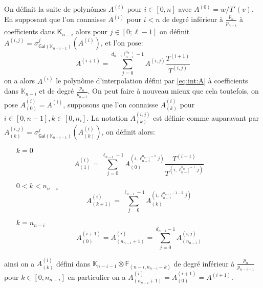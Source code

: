 \documentclass[10pt,a4paper]{book}
\theoremstyle{plain}
\theoremstyle{definition}
\theoremstyle{definition}
\theoremstyle{definition}
\theoremstyle{definition}
\theoremstyle{remark}
\theoremstyle{remark}
\theoremstyle{definition}
\begin{document}
On définit la suite de polynômes $A^{(i)}$ pour $i \in [0, n]$ avec
 $A^{(0)}=w/T'(v)$. En  supposant que l'on connaisse $A^{(i)}$ pour $i < n$ 
 de degré inférieur à $\frac{p_n}{p_{n-i}}$ à coefficients dans 
 $\mathsf{K}_{n-i}$ alors pour $j \in [0 ; \ell-1]$ on définit
 $A^{(i,j)}=\sigma_{\mathsf{Gal}(\mathbb{K}_{n-i-1})}^j(A^{(i)})$, et l'on pose:  
\begin{equation*}
A^{(i+1)}=\sum_{j=0}^{d_{n-i}\ell_{n-i}^{n_{n-i}}-1}A^{(i,j)}\frac{T^{(i+1)}}{T^{(i,j)}} 
\end{equation*}
on a alors $A^{(i)}$ le polynôme d'interpolation défini par \ref{eq:int:A} 
à coefficients dans $\mathbb{K}_{n-i}$ et de degré $\frac{p_n}{p_{n-i}}$.
On peut faire à nouveau mieux que cela toutefois, on pose
$A^{(i)}_{(0)}=A^{(i)}$, supposons que l'on connaisse  $A^{(i)}_{(k)}$ pour 
$i \in [0,n-1], k \in [0,n_i]$. La notation $A^{(i,j)}_{(k)}$ est définie comme
 auparavant par $A^{(i,j)}_{(k)}=\sigma^j_{\mathsf{Gal}(\mathbb{K}_{n-i-1})}
 (A^{(i)}_{(k)})$, on définit alors:
 \begin{itemize}
 \item[$k=0$]
 \[
A^{(i)}_{(1)}=\sum_{j=0}^{\ell_{n-i}-1 }A^{(i,\ell_{n-i}^{n_{n-i}-1}j)}_{(0)}\frac{T^{(i+1)}}{T^{(i,\ell_{n-i}^{n_{n-i}-1}j)}}  \]
\item[$0<k<n_{n-i}$]
\[
A^{(i)}_{(k+1)}=\sum_{j=0}^{\ell_{n-i}-1 }A^{(i,\ell_{n-i}^{n_{n-i}-1-k}j)}_{(k)}  \]
 \item[$k=n_{n-i}$] \[
 A^{(i+1)}_{(0)}=A^{(i)}_{(n_{n-i}+1)}=\sum_{j=0}^{d_{n-i}-1} A^{(i,j)}_{(n_{n-i})}  
  \]
 \end{itemize}
ainsi on a $A^{(i)}_{(k)}$ défini dans $\mathbb{K}_{n-i-1} \otimes \mathsf{F}_{(n-i,n_{n-i}-k)}$
de degré inférieur à $\frac{p_n}{p_{n-i-1}}$ pour $k \in [0,n_{n-i}]$ en 
particulier on a $A^{(i)}_{(n_{n-i}+1)}=A^{(i+1)}_{(0)}=A^{(i+1)}$.  
\end{document}
